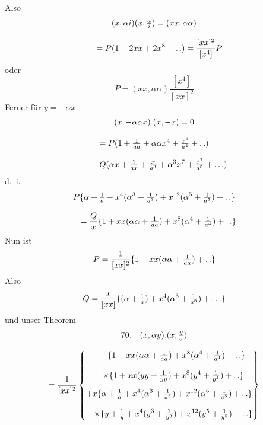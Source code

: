 Also
\[
\begin{gathered}(x,\alpha i)(x,\tfrac ai)=(xx,\alpha\alpha)
 \\[8pt]\quad{}=P(1-2xx+2x^8-\mathinner{.\,.})=\frac{[xx]^2}{[x^4]}P\end{gathered}
\]
oder
\[
P=(xx,\alpha\alpha)\frac{[x^4]}{[xx]^2}
\]
Ferner für $y=-\alpha x$
\[
\begin{gathered}
(x,-\alpha\alpha x).(x,-x)=0\\[8pt]
=P(1+\tfrac1{aa}+\alpha\alpha x^4+\tfrac{x^4}{a^4}+\mathinner{.\,.})
 \\[8pt]\quad{}-Q(\alpha x+\tfrac1{ax}+\tfrac x{a^3}+\alpha^3x^7+\tfrac{x^7}{a^5}+\mathinner{.\,.\,.})
\end{gathered}
\]
d.\ i.
\[
\begin{gathered}
P\{\alpha+\tfrac1a+x^4(\alpha^3+\tfrac1{a^3})+x^{12}(\alpha^5+\tfrac1{a^5})+\mathinner{.\,.}\}\\[8pt]
\quad=\frac Qx\{1+xx(\alpha\alpha+\tfrac1{aa})+x^8(\alpha^4+\tfrac1{a^4})+\mathinner{.\,.}\}
\end{gathered}
\]
Nun ist
\[
P=\frac1{[xx]^2}\{1+xx(\alpha\alpha+\tfrac1{aa})+\mathinner{.\,.}\}
\]
Also
\[
Q=\frac x{[xx]}\{(\alpha+\tfrac1a)+x^4(\alpha^3+\tfrac1{a^3})+\mathinner{.\,.\,.}\}
\]
und unser Theorem
\[
\begin{gathered}
70.\quad{}
(x,\alpha y).(x,\tfrac ya)\\[8pt]
=\frac1{[xx]^2}\left\{\begin{gathered}
\phantom{{}+x}\{1+xx(\alpha\alpha+\tfrac1{aa})+x^8(\alpha^4+\tfrac1{a^4})+\mathinner{.\,.}\}\\[8pt]
\quad\times\{1+xx(yy+\tfrac1{yy})+x^8(y^4+\tfrac1{y^4})+\mathinner{.\,.}\}\\[1ex]
+x\{\alpha+\tfrac1a+x^4(\alpha^3+\tfrac1{a^3})+x^{12}(\alpha^5+\tfrac1{a^5})+\mathinner{.\,.}\}\\[8pt]
\quad\times\{y+\tfrac1y+x^4(y^3+\tfrac1{y^3})+x^{12}(y^5+\tfrac1{y^5})+\mathinner{.\,.}\}
\end{gathered}\right\}
\end{gathered}
\]



